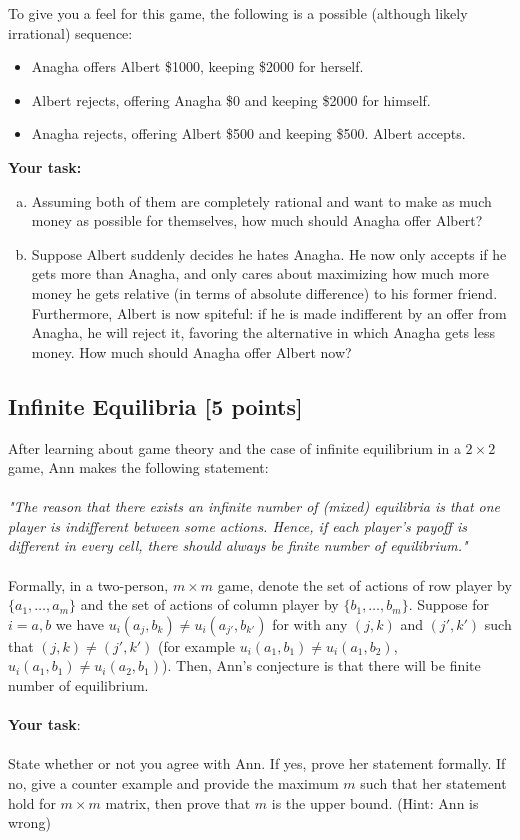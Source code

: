 \documentclass[11pt]{article}
\begin{document}
\noindent To give you a feel for this game, the following is a possible (although likely irrational) sequence:
\begin{itemize}
\item Anagha offers Albert \$1000, keeping \$2000 for herself. 
\item Albert rejects, offering Anagha \$0 and keeping \$2000 for himself.
\item Anagha rejects, offering Albert \$500 and keeping \$500. Albert accepts.\\
\end{itemize}
\textbf{Your task:}

\begin{enumerate}[(a)]

\item
Assuming both of them are completely rational and want to make as much money as possible for themselves, how much should Anagha offer Albert?

\item
Suppose Albert suddenly decides he hates Anagha. He now only accepts if he gets more than Anagha, and only cares about maximizing how much more money he gets relative (in terms of absolute difference) to his former friend. Furthermore, Albert is now spiteful: if he is made indifferent by an offer from Anagha, he will reject it, favoring the alternative in which Anagha gets less money. How much should Anagha offer Albert now?

\end{enumerate}

\subsection{Infinite Equilibria [5 points]}

 After learning about game theory and the case of infinite equilibrium in a $2 \times 2$ game, Ann makes the following statement:\\
\\
\textit{"The reason that there exists an infinite number of (mixed) equilibria is that one player is indifferent between some actions. Hence, if each player's payoff is different in every cell, there should always be finite number of equilibrium."}\\
\\
Formally, in a two-person, $m \times m$ game, denote the set of actions of row player by $\{a_1,\dots, a_m\}$ and the set of actions of column player by $\{b_1,\dots, b_m\}$. Suppose for $i=a,b$ we have $u_i(a_j,b_k) \neq u_i(a_{j'}, b_{k'})$ for with any $(j,k)$ and $(j',k')$ such that $(j,k) \neq (j',k')$ (for example $u_i(a_1,b_1) \neq u_i(a_1,b_2)$, $u_i(a_1,b_1) \neq u_i(a_2,b_1)$). Then, Ann's conjecture is that there will be finite number of equilibrium.\\
\\
\textbf{Your task}: \\
\\
State whether or not you agree with Ann. If yes, prove her statement formally. If no, give a counter example and provide the maximum $m$ such that her statement hold for $m \times m$ matrix, then prove that $m$ is the upper bound. (Hint: Ann is wrong)
\end{document}
